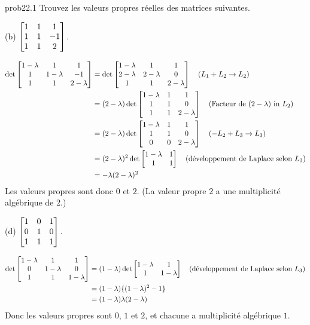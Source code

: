 
\begin{sol}{prob22.1} Trouvez les valeurs propres réelles des matrices suivantes. 
\medskip

(b)  $\bmatrix 
1&1&1\\1&1&-1\\1&1&2 \endbmatrix $.

\soln 

\begin{equation*}
\begin{split}
  \det \bmatrix 
1-\lam&1&1\\1&1-\lam&-1\\1&1&2-\lam \endbmatrix &= \det \bmatrix 
1-\lam&1&1\\2-\lam&2-\lam&0\\1&1&2-\lam \endbmatrix \quad (L_1+L_2\to L_2) \\
  &=(2-\lam)\det \bmatrix 
1-\lam&1&1\\1&1&0\\1&1&2-\lam \endbmatrix \quad (\text{Facteur de  }(2-\lam) \text{ in } L_2)\\
  &=(2-\lam)\det \bmatrix 
1-\lam&1&1\\1&1&0\\0&0&2-\lam \endbmatrix \quad (-L_2+L_3\to L_3)\\
  &=(2-\lam)^2 \det \bmatrix 
1-\lam&1\\1&1\endbmatrix \quad (\text{d\'eveloppement de Laplace selon }L_3)\\
  &= -\lam(2-\lam)^2\\
\end{split}\end{equation*}
Les valeurs propres sont donc $0$ et $2$. (La valeur propre $2$ a une multiplicité algébrique de 2.)

\medskip

(d) $\bmatrix 
1&0&1\\0&1&0\\1&1&1 \endbmatrix $.

\soln 
\begin{equation*}
\begin{split}
 \det  \bmatrix 
1-\lam&1&1\\0&1-\lam&0\\1&1&1-\lam \endbmatrix   &= (1-\lam)\det  \bmatrix 
1-\lam&1\\1&1-\lam \endbmatrix\quad (\text{d\'eveloppement de Laplace selon }L_3)\\
  &=(1-\lam)\{(1-\lam)^2-1\} \\
  &=(1-\lam)\lam(2-\lam)
\end{split}\end{equation*}
Donc les valeurs propres sont $0$, $1$ et $2$, et chacune a multiplicité algébrique $1$.
\medskip



\end{sol}
